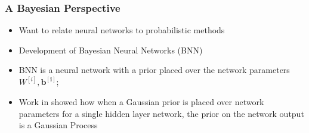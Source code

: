 \documentclass{beamer}
\newcommand{\mb}[1]{\mathbf{#1}}
\begin{document}
\begin{frame}
  \frametitle{A Bayesian Perspective}
  \begin{itemize}
  \item Want to relate neural networks to probabilistic methods
  \item Development of Bayesian Neural Networks (BNN)
  \item BNN is a neural network with a prior placed over the network parameters $W^{[i]}, \mb{b^{[i]}}$; \cite{tishby1989, Neal1996}
  \item Work in \cite{Neal1996} showed how when a Gaussian prior is placed over network parameters for a single hidden layer network, the prior on the network output is a Gaussian Process
  \end{itemize}
\end{frame}
% 
% 
% 
% 
% 
\end{document}
